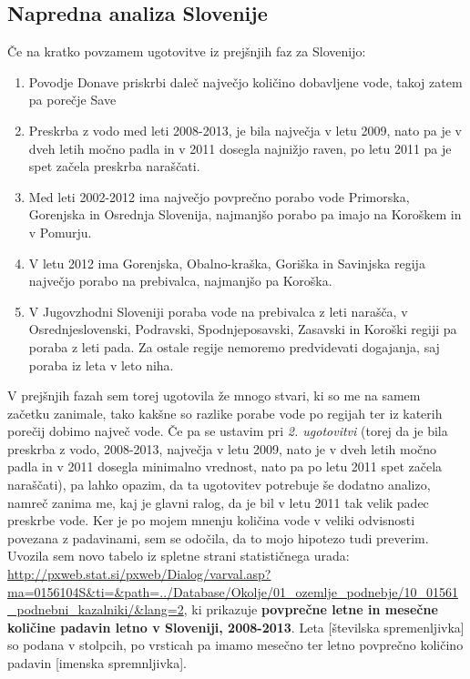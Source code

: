 \documentclass[11pt,a4paper]{article}
\begin{document}
\subsection{Napredna analiza Slovenije}

Če na kratko povzamem ugotovitve iz prejšnjih faz za Slovenijo:
\begin{enumerate} 
\item{Povodje Donave priskrbi daleč največjo količino dobavljene vode, takoj zatem pa porečje Save}
\item{Preskrba z vodo med leti 2008-2013, je bila največja v letu 2009, nato pa je v dveh letih močno padla in v 2011 dosegla najnižjo raven, po letu 2011 pa je spet začela preskrba naraščati.}
\item{Med leti 2002-2012 ima največjo povprečno porabo vode Primorska, Gorenjska in Osrednja Slovenija, najmanjšo porabo pa imajo na Koroškem in v Pomurju.}
\item{V letu 2012 ima Gorenjska, Obalno-kraška, Goriška in Savinjska regija največjo porabo na prebivalca, najmanjšo pa Koroška.}
\item{V Jugovzhodni Sloveniji poraba vode na prebivalca z leti narašča, v Osrednjeslovenski, Podravski, Spodnjeposavski, Zasavski in Koroški regiji pa poraba z leti pada. Za ostale regije nemoremo predvidevati dogajanja, saj poraba iz leta v leto niha.}
\end{enumerate}

V prejšnjih fazah sem torej ugotovila že mnogo stvari, ki so me na samem začetku zanimale, tako kakšne so razlike porabe vode po regijah ter iz katerih porečij dobimo največ vode. Če pa se ustavim pri \emph{2. ugotovitvi} (torej da je bila preskrba z vodo, 2008-2013, največja v letu 2009, nato je v dveh letih močno padla in v 2011 dosegla minimalno vrednost, nato pa po letu 2011 spet začela naraščati), pa lahko opazim, da ta ugotovitev potrebuje še dodatno analizo, namreč zanima me, kaj je glavni ralog, da je bil v letu 2011 tak velik padec preskrbe vode. Ker je po mojem mnenju količina vode v veliki odvisnosti povezana z padavinami, sem se odočila, da to mojo hipotezo tudi preverim. Uvozila sem novo tabelo iz spletne strani statističnega urada: \url{http://pxweb.stat.si/pxweb/Dialog/varval.asp?ma=0156104S&ti=&path=../Database/Okolje/01_ozemlje_podnebje/10_01561_podnebni_kazalniki/&lang=2}, ki prikazuje \textbf{povprečne letne in mesečne količine padavin letno v Sloveniji, 2008-2013}. Leta [številska spremenljivka] so podana v stolpcih, po vrsticah pa imamo mesečno ter letno povprečno količino padavin [imenska spremnljivka]. \\
\end{document}
